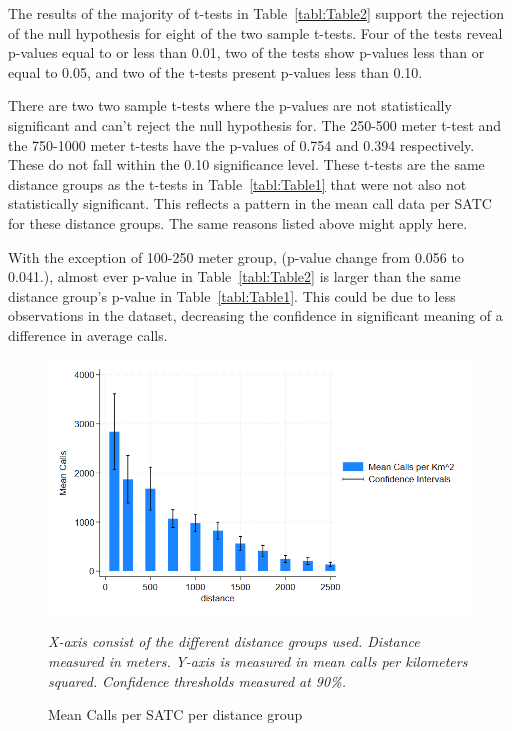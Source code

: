\documentclass[12pt]{article}
\begin{document}
The results of the majority of t-tests in Table~\ref{tabl:Table2} support the rejection of the null hypothesis for eight of the two sample t-tests. Four of the tests reveal p-values equal to or less than 0.01, two of the tests show p-values less than or equal to 0.05, and two of the t-tests present p-values less than 0.10. 

There are two two sample t-tests where the p-values are not statistically significant and can't reject the null hypothesis for. The 250-500 meter t-test and the 750-1000 meter t-tests have the p-values of 0.754 and 0.394 respectively. These do not fall within the 0.10 significance level. These t-tests are the same distance groups as the t-tests in Table~\ref{tabl:Table1} that were not also not statistically significant. This reflects a pattern in the mean call data per SATC for these distance groups. The same reasons listed above might apply here.

With the exception of 100-250 meter group, (p-value change from 0.056 to 0.041.), almost ever p-value in Table~\ref{tabl:Table2} is larger than the same distance group's p-value in Table~\ref{tabl:Table1}. This could be due to less observations in the dataset, decreasing the confidence in significant meaning of a difference in average calls. 

\begin{figure}[htbp]
    \centering
\includegraphics[width=0.75\linewidth]{Reproducibility Package/Visual Graphics/CI_Graph.png}
    \caption{Mean Calls per SATC per distance group}
    \label{fig:Figure3}
     \textit{X-axis consist of the different distance groups used. Distance measured in meters.}
    \textit{Y-axis is measured in mean calls per kilometers squared.}
    \textit{Confidence thresholds measured at 90\%.}
\end{figure}
\end{document}
